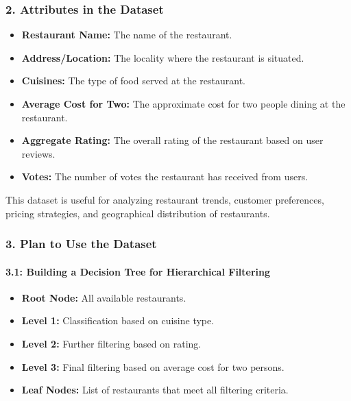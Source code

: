 \documentclass[fontsize=11pt]{article}
\begin{document}
\subsubsection*{2. Attributes in the Dataset}
\begin{itemize}
    \item \textbf{Restaurant Name:} The name of the restaurant.
    \item \textbf{Address/Location:} The locality where the restaurant is situated.
    \item \textbf{Cuisines:} The type of food served at the restaurant.
    \item \textbf{Average Cost for Two:} The approximate cost for two people dining at the restaurant.
    \item \textbf{Aggregate Rating:} The overall rating of the restaurant based on user reviews.
    \item \textbf{Votes:} The number of votes the restaurant has received from users.
\end{itemize}

This dataset is useful for analyzing restaurant trends, customer preferences, pricing strategies, and geographical distribution of restaurants.

\subsubsection*{3. Plan to Use the Dataset}
\paragraph*{3.1: Building a Decision Tree for Hierarchical Filtering}
\begin{itemize}
    \item \textbf{Root Node:} All available restaurants.
    \item \textbf{Level 1:} Classification based on cuisine type.
    \item \textbf{Level 2:} Further filtering based on rating.
    \item \textbf{Level 3:} Final filtering based on average cost for two persons.
    \item \textbf{Leaf Nodes:} List of restaurants that meet all filtering criteria.
\end{itemize}
\end{document}

